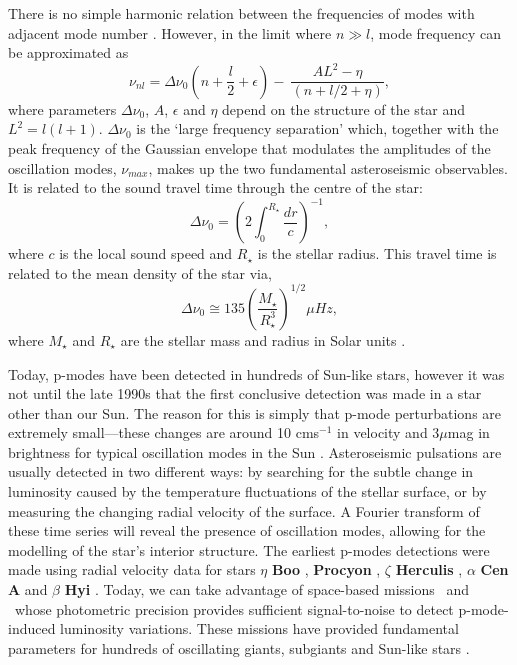 There is no simple harmonic relation between the frequencies of modes with
adjacent mode number \citep{Brown1994}.
However, in the limit where $n \gg l$, mode frequency can be approximated as
\begin{equation}
    \nu_{nl} = \Delta\nu_0\left(n + \frac{l}{2} + \epsilon \right) - \
    \frac{AL^2 - \eta}{(n + l/2 + \eta)},
\end{equation}
where parameters $\Delta\nu_0$, $A$, $\epsilon$ and $\eta$ depend on the
structure of the star and $L^2 = l(l+1)$.
$\Delta\nu_0$ is the `large frequency separation' which, together with the
peak frequency of the Gaussian envelope that modulates the amplitudes of the
oscillation modes, $\nu_{max}$, makes up the two fundamental asteroseismic
observables.
It is related to the sound travel time through the centre of the star:
\begin{equation}
\Delta\nu_0 = \left(2\int_0^{R_\star}\frac{dr}{c}\right)^{-1},
\end{equation}
where $c$ is the local sound speed and $R_\star$ is the stellar radius.
This travel time is related to the mean density of the star via,
\begin{equation}
\Delta\nu_0 \cong 135\left(\frac{M_\star}{R_\star^3}\right)^{1/2}\mu Hz,
\end{equation}
where $M_\star$ and $R_\star$ are the stellar mass and radius in Solar units
\citep{Cox1980, Brown2000}.

Today, p-modes have been detected in hundreds of Sun-like stars, however it
was not until the late 1990s that the first conclusive detection was made in
a star other than our Sun.
The reason for this is simply that p-mode perturbations are extremely
small---these changes are around 10 cms$^{-1}$ in velocity and 3$\mu$mag in
brightness for typical oscillation modes in the Sun \citep{Brown2000}.
Asteroseismic pulsations are usually detected in two different ways: by
searching for the subtle change in luminosity caused by the temperature
fluctuations of the stellar surface, or by measuring the changing radial
velocity of the surface.
A Fourier transform of these time series will reveal the presence of
oscillation modes, allowing for the modelling of the star's interior
structure.
The earliest p-modes detections were made using radial velocity data
\citep{Kjeldsen2001} for stars $\eta$ {\bf Boo} \citep{Kjeldsen1995}, {\bf
Procyon} \citep{Barban1999, Martic1999}, $\zeta$ {\bf Herculis}
\citep{Martic2001}, $\alpha$ {\bf Cen A} \citep{Kjeldsen1999} and $\beta$ {\bf
Hyi} \citep{Bedding2001}.
Today, we can take advantage of space-based missions \kepler\ and \corot\
whose photometric precision provides sufficient signal-to-noise to detect
p-mode-induced luminosity variations.
These missions have provided fundamental parameters for hundreds of
oscillating giants, subgiants and Sun-like stars \citep[e.g.][]{Michel2008,
Bruntt2009, Chaplin2014}.

